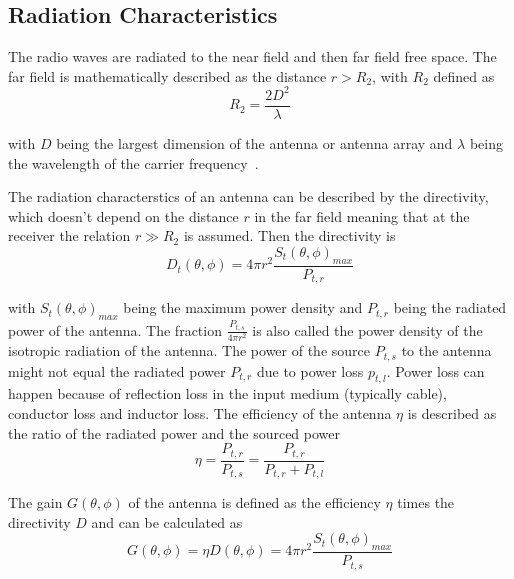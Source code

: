 \subsection{Radiation Characteristics}
The radio waves are radiated to the near field and then far field free space. The far field is mathematically described as the distance $r>R_2$, with $R_2$ defined as
\begin{equation} \label{eq:far_field}
    R_2 = \frac{2 D^2}{\lambda}
\end{equation}

with $D$ being the largest dimension of the antenna or antenna array and $\lambda$ being the wavelength of the carrier frequency~\cite[p. 4]{ant_beam_form}.

The radiation characterstics of an antenna can be described by the directivity, which doesn't depend on the distance $r$ in the far field meaning that at the receiver the relation $r \gg  R_2$ is assumed. Then the directivity is
\begin{equation} \label{eq:directivity}
    D_t\left(\theta, \phi\right) = 4 \pi r^2 \frac{S_t \left(\theta, \phi\right)_{max}}{P_{t,r}}
\end{equation}

with $S_ t\left(\theta, \phi\right)_{max}$ being the maximum power density and $P_{t,r}$ being the radiated power of the antenna. The fraction $\frac{P_{t,s}}{4 \pi r^2}$ is also called the power density of the isotropic radiation of the antenna. The power of the source $P_{t,s}$ to the antenna might not equal the radiated power $P_{t,r}$ due to power loss $p_{t,l}$. Power loss can happen because of reflection loss in the input medium (typically cable), conductor loss and inductor loss. The efficiency of the antenna $\eta$ is described as the ratio of the radiated power and the sourced power %
\begin{equation} \label{eq:antenna_efficiency}
    \eta = \frac{P_{t,r}}{P_{t,s}} = \frac{P_{t,r}}{P_{t,r}+P_{t,l}}
\end{equation}

The gain $G \left( \theta, \phi \right)$ of the antenna is defined as the efficiency $\eta$ times the directivity $D$ and can be calculated as
\begin{equation} \label{eq:gain}
    G \left( \theta, \phi \right) = \eta  D\left(\theta, \phi\right) = 4 \pi r^2 \frac{S_t \left(\theta, \phi\right)_{max}}{P_{t,s}}
\end{equation}

